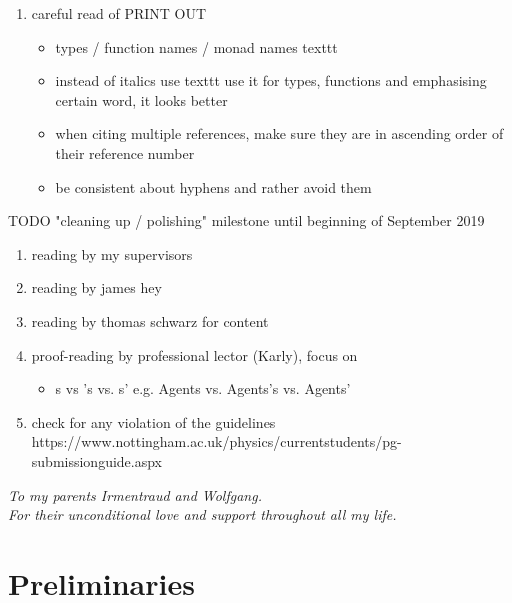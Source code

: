 \documentclass[oneside]{book}
\begin{document}
\begin{enumerate}
	\item careful read of PRINT OUT
	\begin{itemize}
		\item types / function names / monad names texttt
		\item instead of italics use texttt use it for types, functions and emphasising certain word, it looks better
		\item when citing multiple references, make sure they are in ascending order of their reference number	
		\item be consistent about hyphens and rather avoid them	
	\end{itemize}
\end{enumerate}

TODO "cleaning up / polishing" milestone until beginning of September 2019
\begin{enumerate}
	\item reading by my supervisors

	\item reading by james hey
	
	\item reading by thomas schwarz for content
		
	\item proof-reading by professional lector (Karly), focus on 
	\begin{itemize}
		\item s vs 's vs. s' e.g. Agents vs. Agents's vs. Agents'
	\end{itemize}
	
	\item check for any violation of the guidelines https://www.nottingham.ac.uk/physics/currentstudents/pg-submissionguide.aspx
\end{enumerate}

\clearpage
\begin{center}
    \thispagestyle{empty}
    \vspace*{\fill}
    \textit{To my parents Irmentraud and Wolfgang. \\ For their unconditional love and support throughout all my life.}
    \vspace*{\fill}
\end{center}

\clearpage


\epigraphhead[450]{}
\part{Preliminaries}
\label{part:preliminaries}



\end{document}
